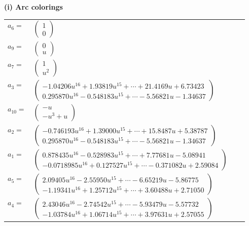 \documentclass[1p]{elsarticle_modified}
\theoremstyle{definition}
\begin{document}
\flushleft \textbf{(i) Arc colorings}\\
\begin{tabular}{m{7pt} m{180pt} m{7pt} m{180pt} }
\flushright $a_{6}=$&$\begin{pmatrix}1\\0\end{pmatrix}$ \\
\flushright $a_{9}=$&$\begin{pmatrix}0\\u\end{pmatrix}$ \\
\flushright $a_{7}=$&$\begin{pmatrix}1\\u^2\end{pmatrix}$ \\
\flushright $a_{3}=$&$\begin{pmatrix}-1.04206 u^{16}+1.93819 u^{15}+\cdots+21.4169 u+6.73423\\0.295870 u^{16}-0.548183 u^{15}+\cdots-5.56821 u-1.34637\end{pmatrix}$ \\
\flushright $a_{10}=$&$\begin{pmatrix}- u\\- u^3+u\end{pmatrix}$ \\
\flushright $a_{2}=$&$\begin{pmatrix}-0.746193 u^{16}+1.39000 u^{15}+\cdots+15.8487 u+5.38787\\0.295870 u^{16}-0.548183 u^{15}+\cdots-5.56821 u-1.34637\end{pmatrix}$ \\
\flushright $a_{1}=$&$\begin{pmatrix}0.878435 u^{16}-0.528983 u^{15}+\cdots+7.77681 u-5.08941\\-0.0718985 u^{16}+0.127527 u^{15}+\cdots-0.371082 u+2.59084\end{pmatrix}$ \\
\flushright $a_{5}=$&$\begin{pmatrix}2.09405 u^{16}-2.55950 u^{15}+\cdots-6.65219 u-5.86775\\-1.19341 u^{16}+1.25712 u^{15}+\cdots+3.60488 u+2.71050\end{pmatrix}$ \\
\flushright $a_{4}=$&$\begin{pmatrix}2.43046 u^{16}-2.74542 u^{15}+\cdots-5.93479 u-5.57732\\-1.03784 u^{16}+1.06714 u^{15}+\cdots+3.97631 u+2.57055\end{pmatrix}$ \\

\end{tabular}
\end{document}
